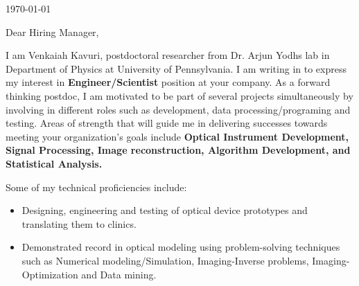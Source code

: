 \documentclass{my_cv}
\begin{document}
\vspace{-2mm}
\begin{center} 
\begin{footnotesize}
\end{footnotesize}

\href{https://www.linkedin.com/in/venkaiahchowdarykavuri}{\faLinkedinSquare} \href{https://github.com/Venki-Kavuri}{\faGithub} \href{https://scholar.google.com/citations?hl=en&user=r5E9ACIAAAAJ&view_op=list_works}{\aiGoogleScholar} \href{https://www.facebook.com/venki.kavuri}{\faFacebookOfficial}
\end{center} 
\vspace{5mm} 
\today\\
\vspace{5mm} 



Dear Hiring Manager,\\
\vspace{2mm}

I am Venkaiah Kavuri, postdoctoral researcher from Dr. Arjun Yodh\textquotesingle s lab in Department of Physics at University of Pennsylvania. I am writing in to express my interest in \textbf{Engineer/Scientist} position at your company. As a forward thinking postdoc, I am motivated to be part of several projects simultaneously by involving in different roles such as development, data processing/programing and testing. Areas of strength that will guide me in delivering successes towards meeting your organization's goals include  \textbf{Optical Instrument Development, Signal Processing, Image reconstruction, Algorithm Development, and Statistical Analysis.}\\
\vspace{2mm} 


Some of my technical proficiencies include:\\
\begin{itemize}\itemsep -2pt
\item Designing, engineering and testing of optical device prototypes and translating them to clinics.\\
\item Demonstrated record in optical modeling using problem-solving techniques such as Numerical modeling/Simulation, Imaging-Inverse problems, Imaging-Optimization and Data mining.\\

\end{itemize} 
\end{document}

